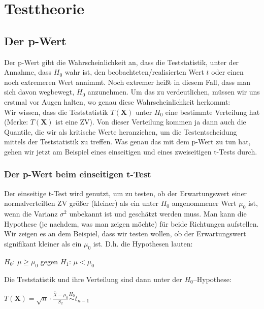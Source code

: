 \documentclass[a4paper]{article}
\newcommand{\simtext}[1]{\ensuremath{\stackrel{\text{#1}}{\sim}}}
\begin{document}
\clearpage


\section{Testtheorie}\label{sec:Tests}

\subsection{Der p-Wert}\label{sec:pWert}

Der p-Wert gibt die Wahrscheinlichkeit an, dass die Teststatistik, unter der Annahme, dass $H_0$ wahr ist, den beobachteten/realisierten Wert $t$ oder einen noch extremeren Wert annimmt. Noch extremer heißt in diesem Fall, dass man sich davon wegbewegt, $H_0$ anzunehmen. Um das zu verdeutlichen, müssen wir uns erstmal vor Augen halten, wo genau diese Wahrscheinlichkeit herkommt: \\

\noindent Wir wissen, dass die Teststatistik $T(\textbf{X})$ unter $H_0$ eine bestimmte Verteilung hat (Merke: $T(\textbf{X})$ ist eine ZV). Von dieser Verteilung kommen ja dann auch die Quantile, die wir als kritische Werte heranziehen, um die Testentscheidung mittels der Teststatistik zu treffen. Was genau das mit dem p-Wert zu tun hat, gehen wir jetzt am Beispiel eines einseitigen und eines zweiseitigen t-Tests durch.

\subsubsection{Der p-Wert beim einseitigen t-Test}\label{sec:pWert1}

Der einseitige t-Test wird genutzt, um zu testen, ob der Erwartungswert einer normalverteilten ZV größer (kleiner) als ein unter $H_0$ angenommener Wert $\mu_0$ ist, wenn die Varianz $\sigma^2$ unbekannt ist und geschätzt werden muss.  Man kann die Hypothese (je nachdem, was man zeigen möchte) für beide Richtungen aufstellen. Wir zeigen es an dem Beispiel, dass wir testen wollen, ob der Erwartungswert signifikant kleiner als ein $\mu_0$ ist. D.h. die Hypothesen lauten: \\
\begin{center} $H_0$: $\mu \geq \mu_0$ \hspace{2cm }gegen \hspace{2cm } $H_1$: $\mu < \mu_0$ \end{center}
Die Teststatistik und ihre Verteilung sind dann unter der $H_0$--Hypothese:\\
\begin{center} $T(\textbf{X})=\sqrt{n}\cdot\frac{\overline{X}-\mu_0}{S_x} \simtext{$H_0$} t_{n-1}$ \end{center}
\end{document}
